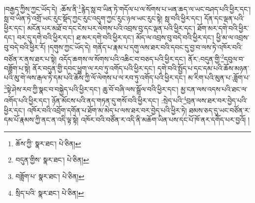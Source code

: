 །བརྒྱད་ཀྱིས་ཀྱང་ཡོད་དེ། :ཆོས་ནི་\footnote{ཆོས་ཀྱི་  སྣར་ཐང་།  པེ་ཅིན། }རྙེད་སླ་བ་ཡིན་ཏེ་གདོལ་པ་ལ་སོགས་པ་ཡན་ཆད་ལ་ཡང་བཤད་པའི་ཕྱིར་དང་། སླ་བ་ཡིན་ཏེ་འགྲོ་ཡང་རུང་སྡོད་ཀྱང་རུང་འདུག་ཀྱང་རུང་ཉལ་ཡང་རུང་སྟེ། སླ་བའི་ཕྱིར་དང་། དོན་དང་ལྡན་པའི་ཕྱིར་དང་། མངོན་པར་མཐོ་བ་དང་ངེས་པར་ལེགས་པའི་འབྲས་བུ་དང་ལྡན་པའི་ཕྱིར་དང་། ཐོག་མར་དགེ་བའི་ཕྱིར་དང་། བར་དུ་དགེ་བའི་ཕྱིར་དང་། ཐ་མར་དགེ་བའི་ཕྱིར་དང་། མོད་ལ་འབྲས་བུ་བདེ་བའི་ཕྱིར་དང་། ཕྱི་མ་ལ་འབྲས་བུ་བདེ་བའི་ཕྱིར་རོ། །དགུས་ཀྱང་ཡོད་དེ། གནོད་པ་རྣམ་པ་དགུ་ལས་ཐར་བའི་དབང་དུ་བྱ་བ་ལས་ཏེ་འཁོར་བའི་བཙོན་ར་ནས་ཐར་པ་སྟེ། འདོད་ཆགས་ལ་སོགས་པའི་འཆིང་བ་བཅད་པའི་ཕྱིར་དང་། ནོར་:བདུན་གྱི་\footnote{བདུན་གྱིས་  སྣར་ཐང་།  པེ་ཅིན། }དབུལ་བ་བཟློག་པ་སྟེ། ནོར་བདུན་གྱི་དབང་ཕྱུག་ལ་རབ་ཏུ་འགོད་པའི་ཕྱིར་དང་། དགེ་བའི་སྤྱོད་པ་དང་དམ་པའི་ཆོས་མཉན་པའི་མུ་གེ་ལས་རྒལ་ཏེ་དམ་པའི་ཆོས་ཀྱི་ལོ་ལེགས་པ་ལ་རབ་ཏུ་འགོད་པའི་ཕྱིར་དང་། མ་རིག་པའི་མུན་པ་:ཟློག་པ་\footnote{བཟློག་པ་  སྣར་ཐང་།  པེ་ཅིན། }སྟེ་ཤེས་རབ་ཀྱི་སྣང་བ་བསྐྱེད་པའི་ཕྱིར་དང་། ཆུ་བོ་བཞི་ལས་སྒྲོལ་བའི་ཕྱིར་དང་། མྱ་ངན་ལས་འདས་པའི་ཐང་ལ་འགོད་པའི་ཕྱིར་དང་། ཉོན་མོངས་པའི་ནད་གཏན་དུ་གསོ་བའི་ཕྱིར་དང་། :སྲེད་པའི་\footnote{སྲིད་པའི་  སྣར་ཐང་།  པེ་ཅིན། }བྲན་ལས་ཐར་བར་བྱེད་པའི་ཕྱིར་དང་། འཁོར་བའི་འབྲོག་དགོན་པ་ཐོག་མ་མེད་པ་ལས་ཐར་བར་བྱེད་པའི་ཕྱིར་ཏེ། ཐམས་ཅད་དུ་ཡང་བཙོན་ར་དམ་པོ་རྣམས་ཀྱི་ནང་ན་འདི་ལྟ་སྟེ། འཁོར་བའི་བཙོན་ར་འདི་ནི་མཆོག་ཡིན་པས་དང་པོ་ཁོ་ནར་དགོད་པར་བྱའོ། །
